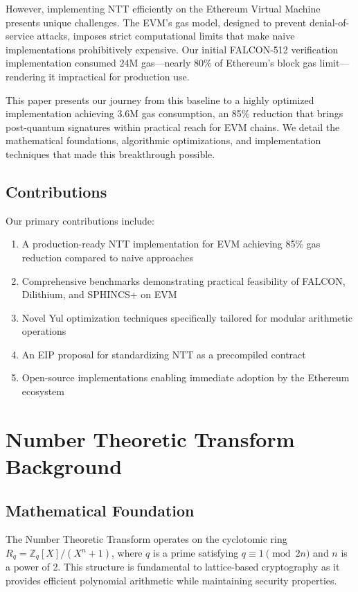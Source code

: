 \documentclass[11pt,a4paper]{article}
\begin{document}
However, implementing NTT efficiently on the Ethereum Virtual Machine presents unique challenges. The EVM's gas model, designed to prevent denial-of-service attacks, imposes strict computational limits that make naive implementations prohibitively expensive. Our initial FALCON-512 verification implementation consumed 24M gas—nearly 80\% of Ethereum's block gas limit—rendering it impractical for production use.

This paper presents our journey from this baseline to a highly optimized implementation achieving 3.6M gas consumption, an 85\% reduction that brings post-quantum signatures within practical reach for EVM chains. We detail the mathematical foundations, algorithmic optimizations, and implementation techniques that made this breakthrough possible.

\subsection{Contributions}

Our primary contributions include:
\begin{enumerate}
\item A production-ready NTT implementation for EVM achieving 85\% gas reduction compared to naive approaches
\item Comprehensive benchmarks demonstrating practical feasibility of FALCON, Dilithium, and SPHINCS+ on EVM
\item Novel Yul optimization techniques specifically tailored for modular arithmetic operations
\item An EIP proposal for standardizing NTT as a precompiled contract
\item Open-source implementations enabling immediate adoption by the Ethereum ecosystem
\end{enumerate}

\section{Number Theoretic Transform Background}

\subsection{Mathematical Foundation}

The Number Theoretic Transform operates on the cyclotomic ring $R_q = \mathbb{Z}_q[X]/(X^n + 1)$, where $q$ is a prime satisfying $q \equiv 1 \pmod{2n}$ and $n$ is a power of 2. This structure is fundamental to lattice-based cryptography as it provides efficient polynomial arithmetic while maintaining security properties.
\end{document}

